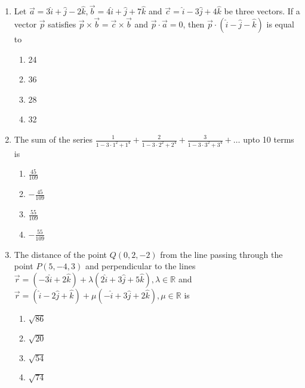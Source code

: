 \documentclass[journal]{IEEEtran}
\begin{document}
\begin{enumerate}
    \item Let $\overrightarrow{a} = 3\hat{i} + \hat{j} - 2\hat{k}, \overrightarrow{b} = 4\hat{i} + \hat{j} + 7\hat{k}$
    and $\overrightarrow{c} = \hat{i} - 3\hat{j} + 4\hat{k}$ be three vectors. If a
    vector $\overrightarrow{p}$ satisfies $\overrightarrow{p} \times \overrightarrow{b} = \overrightarrow{c} \times \overrightarrow{b}$
    and $\overrightarrow{p} \cdot \overrightarrow{a} = 0$, then $\overrightarrow{p} \cdot (\hat{i} - \hat{j} - \hat{k})$
    is equal to

    \begin{multicols}{4}
\begin{enumerate}

        \item 24
        \item 36
        \item 28
        \item 32
    \end{enumerate}
\end{multicols}

    \item The sum of the series $\frac{1}{1-3\cdot 1^2+1^4}+\frac{2}{1-3\cdot 2^2+2^4}
    +\frac{3}{1-3\cdot 3^2+3^4} + \dots$ upto 10 terms is

    \begin{multicols}{4}
\begin{enumerate}

        \item $\frac{45}{109}$
        \item $-\frac{45}{109}$
        \item $\frac{55}{109}$
        \item $-\frac{55}{109}$
    \end{enumerate}
\end{multicols}

    \item The distance of the point $Q(0, 2, -2)$ from the line passing
    through the point $P(5, -4, 3)$ and perpendicular to the lines 
    $\overrightarrow{r} = (-3\hat{i} + 2\hat{k}) + \lambda(2\hat{i} + 3\hat{j} + 5\hat{k}), \lambda \in \mathbb{R}$
    and $\overrightarrow{r} = (\hat{i} - 2\hat{j} + \hat{k}) + \mu(-\hat{i} + 3\hat{j} + 2\hat{k}), \mu \in \mathbb{R}$
    is

    \begin{multicols}{4}
\begin{enumerate}

        \item $\sqrt{86}$
        \item $\sqrt{20}$
        \item $\sqrt{54}$
        \item $\sqrt{74}$
    \end{enumerate}
\end{multicols}


\end{enumerate}
\end{document}

